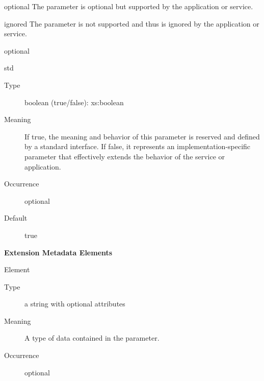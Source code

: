 \documentclass[11pt,a4paper]{ivoa}
\begin{document}
\begin{generated}
\begin{bigdescription}
\begin{description}
\begin{longtermsdescription}
\item[optional]
                  The parameter is optional but supported by the application or
                  service.
               
\item[ignored]
                  The parameter is not supported and thus is ignored by the 
                  application or service.
               
\end{longtermsdescription}
\item[Default] optional
\end{description}
\item[std]
\begin{description}
\item[Type] boolean (true/false): xs:boolean
\item[Meaning] 
                     If true, the meaning and behavior of this parameter is
                     reserved and defined by a standard interface.  If
                     false, it represents an implementation-specific
                     parameter that effectively extends the behavior of the 
                     service or application.  
                  
\item[Occurrence] optional
\item[Default] true
\end{description}


\end{bigdescription}\endgroup



\vspace{0.5ex}\noindent\textbf{ Extension Metadata Elements}

\begingroup\small\begin{bigdescription}\item[Element \xmlel{dataType}]
\begin{description}
\item[Type] a string with optional attributes
\item[Meaning] 
                        A type of data contained in the parameter.
                     
\item[Occurrence] optional

\end{description}


\end{bigdescription}\endgroup

\endgroup
\end{generated}
\end{document}
